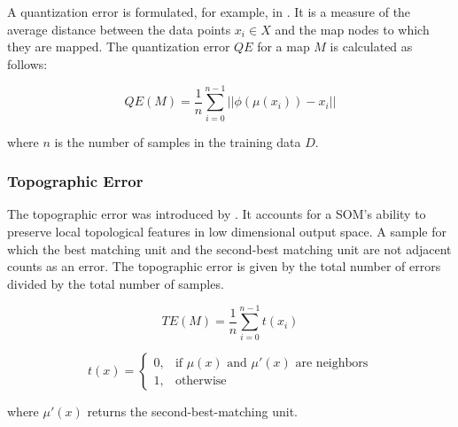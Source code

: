A quantization error is formulated, for example, in \cite{wandeto2019quantization}. It is a measure of the average distance between the data points $x_i \in X$ and the map nodes to which they are mapped. The quantization error $QE$ for a map $M$ is calculated as follows:

$$
 QE(M) = \frac{1}{n}\sum_{i=0}^{n-1} ||\phi(\mu(x_i)) - x_i ||
$$

where $n$ is the number of samples in the training data $D$.

\subsubsection*{Topographic Error}

The topographic error was introduced by \cite{kiviluoto1996topology}. It accounts for a SOM's ability to preserve local topological features in low dimensional output space. A sample for which the best matching unit and the second-best matching unit are not adjacent counts as an error. The topographic error is given by the total number of errors divided by the total number of samples.

$$
    TE(M) = \frac{1}{n}\sum_{i=0}^{n-1}t(x_i)
$$

$$
    t(x) = \begin{cases}
			0, & \text{if $\mu(x)$ and $\mu'(x)$ are neighbors}\\
            1, & \text{otherwise}
		 \end{cases}
$$

where $\mu'(x)$ returns the second-best-matching unit.